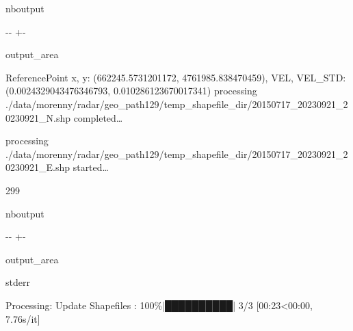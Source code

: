 \documentclass[letterpaper,10pt,english]{sphinxmanual}
\begin{document}
\begin{sphinxuseclass}{nboutput}
{

\kern-\sphinxverbatimsmallskipamount\kern-\baselineskip
\kern+\FrameHeightAdjust\kern-\fboxrule
\vspace{\nbsphinxcodecellspacing}

\begin{sphinxuseclass}{output_area}
\begin{sphinxuseclass}{}


\begin{sphinxVerbatim}[commandchars=\\\{\}]
ReferencePoint x, y: (662245.5731201172, 4761985.838470459), VEL, VEL\_STD: (0.0024329043476346793, 0.010286123670017341)
processing ./data/morenny/radar/geo\_path129/temp\_shapefile\_dir/20150717\_20230921\_20230921\_N.shp completed{\ldots}

processing ./data/morenny/radar/geo\_path129/temp\_shapefile\_dir/20150717\_20230921\_20230921\_E.shp started{\ldots}

299
\end{sphinxVerbatim}



\end{sphinxuseclass}
\end{sphinxuseclass}
}

\end{sphinxuseclass}
\begin{sphinxuseclass}{nboutput}
{

\kern-\sphinxverbatimsmallskipamount\kern-\baselineskip
\kern+\FrameHeightAdjust\kern-\fboxrule
\vspace{\nbsphinxcodecellspacing}

\begin{sphinxuseclass}{output_area}
\begin{sphinxuseclass}{stderr}


\begin{sphinxVerbatim}[commandchars=\\\{\}]
Processing: Update Shapefiles : 100\%|██████████| 3/3 [00:23<00:00,  7.76s/it]
\end{sphinxVerbatim}



\end{sphinxuseclass}
\end{sphinxuseclass}
}

\end{sphinxuseclass}
\end{document}
